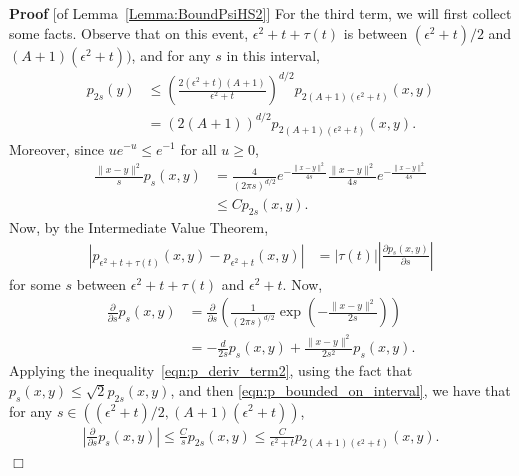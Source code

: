 \documentclass[12pt]{article}
\newenvironment {proof}{{\noindent\bf Proof }}{\hfill $\Box$ \medskip}
\begin{document}
\begin{proof}[of Lemma~\ref{Lemma:BoundPsiHS2}]
    For the third term, we will first collect some facts.
    Observe that on this event,
    $\epsilon^2 + t + \tau(t)$ is between
    $(\epsilon^2 + t)/ 2$ and $(A + 1)(\epsilon^2 + t))$,
    and for any $s$ in this interval,
    \begin{align}
        p_{2s}(y)
        &\le \nonumber
        \left( \frac{
            2 (\epsilon^2 + t)(A + 1)
        }{
            \epsilon^2 + t
        } \right)^{d/2}
        p_{2(A+1)(\epsilon^2 + t)}(x, y)
        \\ &= \label{eqn:p_bounded_on_interval}
        (2(A+1))^{d/2}
        p_{2(A+1)(\epsilon^2 + t)}(x, y) .
    \end{align}
    Moreover, since $u e^{-u} \le e^{-1}$ for all $u \ge 0$,
    \begin{align}
        \frac{\|x - y\|^2}{s} p_s(x, y)
        &= \nonumber
        \frac{4}{(2 \pi s)^{d/2}}
        e^{- \frac{ \|x-y\|^2 }{ 4s }}
        \frac{\|x-y\|^2}{4s}
        e^{- \frac{ \|x-y\|^2 }{ 4s }}
        \\ &\le \label{eqn:p_deriv_term2}
        C p_{2s}(x, y) .
    \end{align}
    Now, by the Intermediate Value Theorem,
    \begin{align*}
        \left|
            p_{\epsilon^2 + t + \tau(t)}(x, y)
            -
            p_{\epsilon^2 + t}(x, y)
        \right|
        &=
        \left| \tau(t) \right|
        \left| \frac{\partial p_s(x, y)}{\partial s} \right|
    \end{align*}
    for some $s$ between $\epsilon^2 + t + \tau(t)$ and $\epsilon^2 + t$.
    Now,
    \begin{align*}
        \frac{\partial}{\partial s} p_s(x, y)
        &=
        \frac{\partial}{\partial s}
        \left(
            \frac{1}{(2 \pi s)^{d/2}}
            \exp\left( - \frac{\|x - y\|^2}{2 s} \right)
        \right)
        \\ &=
        - \frac{d}{2s} p_s(x, y) + \frac{\|x - y\|^2}{2 s^2} p_s(x, y)  .
    \end{align*}
    Applying the inequality~\eqref{eqn:p_deriv_term2},
    using the fact that $p_s(x, y) \le \sqrt{2} p_{2s}(x,y)$,
    and then \eqref{eqn:p_bounded_on_interval},
    we have that for any $s \in ((\epsilon^2 + t)/ 2, (A + 1)(\epsilon^2 + t))$,
    \begin{align*}
        \left| \frac{\partial}{\partial s} p_s(x, y) \right|
        \le
        \frac{C}{s} p_{2s}(x, y) 
        \le
        \frac{C}{\epsilon^2 + t} p_{2(A + 1)(\epsilon^2 + t)}(x, y) .

\end{align*}
\end{proof}
\end{document}
